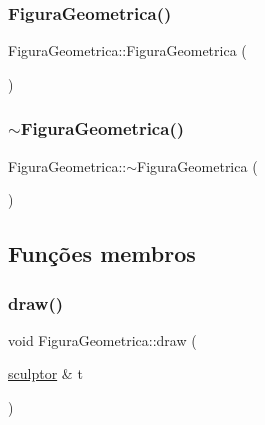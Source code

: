 \subsubsection{\texorpdfstring{FiguraGeometrica()}{FiguraGeometrica()}}
{\footnotesize\ttfamily Figura\+Geometrica\+::\+Figura\+Geometrica (\begin{DoxyParamCaption}{ }\end{DoxyParamCaption})}


\begin{DoxyCode}{0}

\end{DoxyCode}
\mbox{\label{class_figura_geometrica_ad13b9bccf1b14f6b9fbc662aad61ffd1}} 
\subsubsection{\texorpdfstring{$\sim$FiguraGeometrica()}{~FiguraGeometrica()}}
{\footnotesize\ttfamily Figura\+Geometrica\+::$\sim$\+Figura\+Geometrica (\begin{DoxyParamCaption}{ }\end{DoxyParamCaption})\hspace{0.3cm}{\ttfamily [virtual]}}


\begin{DoxyCode}{0}

\end{DoxyCode}


\subsection{Funções membros}
\mbox{\label{class_figura_geometrica_ac996dac6561c450beaf5fd643e43e095}} 
\subsubsection{\texorpdfstring{draw()}{draw()}}
{\footnotesize\ttfamily void Figura\+Geometrica\+::draw (\begin{DoxyParamCaption}\item[{\mbox{\hyperlink{classsculptor}{sculptor}} \&}]{t }\end{DoxyParamCaption})\hspace{0.3cm}{\ttfamily [pure virtual]}}



